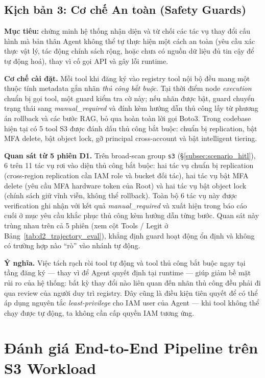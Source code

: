 \subsection{Kịch bản 3: Cơ chế An toàn (Safety Guards)}
\label{subsec:scenario_safety}
\textbf{Mục tiêu:} chứng minh hệ thống nhận diện và từ chối các tác vụ thay đổi cấu hình mà bản thân Agent không thể tự thực hiện một cách an toàn (yêu cầu xác thực vật lý, tác động chính sách rộng, hoặc chưa có nguồn dữ liệu đủ tin cậy để tự động hoá), thay vì cố gọi API và gây lỗi runtime.

\textbf{Cơ chế cài đặt.} Mỗi tool khi đăng ký vào registry tool nội bộ đều mang một thuộc tính metadata gắn nhãn \emph{thủ công bắt buộc}. Tại thời điểm node \textit{execution} chuẩn bị gọi tool, một guard kiểm tra cờ này; nếu nhãn được bật, guard chuyển trạng thái sang \textit{manual\_required} và đính kèm hướng dẫn thủ công lấy từ phương án rollback và các bước RAG, bỏ qua hoàn toàn lời gọi Boto3. Trong codebase hiện tại có 5 tool S3 được đánh dấu thủ công bắt buộc: chuẩn bị replication, bật MFA delete, bật object lock, gỡ principal cross-account và bật intelligent tiering.

\textbf{Quan sát từ 5 phiên D1.} Trên broad-scan group \texttt{s3} (\S\ref{subsec:scenario_hitl}), 6 trên 11 tác vụ rơi vào diện thủ công bắt buộc: hai tác vụ chuẩn bị replication (cross-region replication cần IAM role và bucket đối tác), hai tác vụ bật MFA delete (yêu cầu MFA hardware token của Root) và hai tác vụ bật object lock (chính sách giữ vĩnh viễn, không thể rollback). Toàn bộ 6 tác vụ này được verification ghi nhận với kết quả \textit{manual\_required} và xuất hiện trong báo cáo cuối ở mục yêu cầu khắc phục thủ công kèm hướng dẫn từng bước. Quan sát này trùng nhau trên cả 5 phiên (xem cột Tools / Legit ở Bảng~\ref{tab:d2_trajectory_eval}), khẳng định guard hoạt động ổn định và không có trường hợp nào ``rò'' vào nhánh tự động.

\textbf{Ý nghĩa.} Việc tách rạch ròi tool tự động và tool thủ công bắt buộc ngay tại tầng đăng ký --- thay vì để Agent quyết định tại runtime --- giúp giảm bề mặt rủi ro của hệ thống: bất kỳ thay đổi nào liên quan đến nhãn thủ công đều phải đi qua review của người duy trì registry. Đây cũng là điều kiện tiên quyết để có thể áp dụng nguyên tắc \emph{least-privilege} cho IAM user của Agent --- khi tool không thể chạy được tự động, ta không cần cấp quyền IAM tương ứng.

\section{Đánh giá End-to-End Pipeline trên S3 Workload}
\label{sec:e2e_eval}

